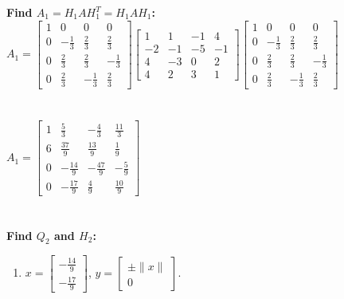 \documentclass[12pt]{article}
\begin{document}
\begin{enumerate}[label=(\alph*)]
\begin{enumerate}[label=(\roman*)]
        \end{enumerate}
        \textbf{Find $A_1 = H_1AH_1^T = H_1AH_1$:} \\
             $A_1 = \begin{bmatrix} 1 & 0 & 0 & 0 \\ 0 & -\frac{1}{3} & \frac{2}{3} & \frac{2}{3} \\ 0 & \frac{2}{3} & \frac{2}{3} &  -\frac{1}{3} \\ 0 & \frac{2}{3} & -\frac{1}{3} & \frac{2}{3} \end{bmatrix} 
            \begin{bmatrix} 1 & 1 & -1 & 4 \\ -2 & -1 & -5 & -1 \\ 4 & -3 & 0 & 2 \\ 4 & 2 & 3 & 1 \end{bmatrix} 
            \begin{bmatrix} 1 & 0 & 0 & 0 \\ 0 & -\frac{1}{3} & \frac{2}{3} & \frac{2}{3} \\ 0 & \frac{2}{3} & \frac{2}{3} &  -\frac{1}{3} \\ 0 & \frac{2}{3} & -\frac{1}{3} & \frac{2}{3} \end{bmatrix}$ \\ \\ \\
            $ A_1 = \begin{bmatrix} 1 & \frac{5}{3} & -\frac{4}{3} & \frac{11}{3} \\ 6 & \frac{37}{9} & \frac{13}{9} & \frac{1}{9} \\ 0 & -\frac{14}{9} & -\frac{47}{9} & -\frac{5}{9} \\ 0 & -\frac{17}{9} & \frac{4}{9} & \frac{10}{9} \end{bmatrix}$ \\ \\ \\
        \textbf{Find $Q_2$ and $H_2$:} \\
        \begin{enumerate}[label=(\roman*)]
            \item $x = \begin{bmatrix} -\frac{14}{9} \\ -\frac{17}{9} \end{bmatrix}$, \quad $y = \begin{bmatrix} \pm \|x\| \\ 0 \end{bmatrix}$.\\\\\\

\end{enumerate}
\end{enumerate}
\end{document}
